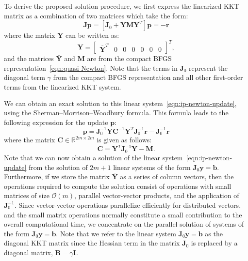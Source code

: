 \documentclass[12pt]{article}
\newcommand{\mb}{\mathbf}
\begin{document}
To derive the proposed solution procedure, we first express the linearized KKT matrix as a combination of two matrices
which take the form:
%
\begin{equation}
  \label{eqn:ip-newton-update}
  \mb{J} \mb{p} = \left[ \mb{J}_{0} + \mb{Y} \mb{M} \mb{Y}^{T} \right] \mb{p} = - \mb{r}
\end{equation}
where the matrix $\mb{Y}$ can be written as:
%
\begin{equation*}
  \mb{Y} = \begin{bmatrix} \bar{\mb{Y}}^T & 0 & 0 & 
    0 & 0 & 0 & 0 \end{bmatrix}^{T}, 
\end{equation*}
and the matrices $\bar{\mb{Y}}$ and $\mb{M}$ are from the compact BFGS
representation~\eqref{eqn:quasi-Newton}. Note that the terms in
$\mb{J}_{0}$ represent the diagonal term $\gamma$ from the compact
BFGS representation and all other first-order terms from the
linearized KKT system.

We can obtain an exact solution to this linear
system~\eqref{eqn:ip-newton-update}, using the
Sherman--Morrison--Woodbury formula.  This formula leads to the
following expression for the update $\mb{p}$:
\begin{equation*}
  \mb{p} = \mb{J}^{-1}_{0} \mb{Y} \mb{C}^{-1} \mb{Y}^{T} \mb{J}_{0}^{-1} \mb{r} - \mb{J}_{0}^{-1} \mb{r}  
\end{equation*}
where the matrix $\mb{C} \in \mathbb{R}^{2m \times 2m}$ is given as
follows:
\begin{equation*}
  \mb{C} = \mb{Y}^{T} \mb{J}_{0}^{-1}\mb{Y} - \mb{M}.
\end{equation*}
Note that we can now obtain a solution of the linear
system~\eqref{eqn:ip-newton-update} from the solution of $2m+1$ linear
systems of the form $\mb{J}_{0}\mb{y} = \mb{b}$.  Furthermore, if we
store the matrix $\bar{\mb{Y}}$ as a series of column vectors, then
the operations required to compute the solution consist of operations
with small matrices of size $\mathcal{O}(m)$, parallel vector-vector
products, and the application of $\mb{J}_{0}^{-1}$. Since
vector-vector operations parallelize efficiently for distributed
vectors, and the small matrix operations normally constitute a small
contribution to the overall computational time, we concentrate on the
parallel solution of systems of the form $\mb{J}_{0} \mb{y} =
\mb{b}$. Note that we refer to the linear system $\mb{J}_{0} \mb{y} =
\mb{b}$ as the diagonal KKT matrix since the Hessian term in the matrix
$\mb{J}_{0}$ is replaced by a diagonal matrix, $\mb{B} =
\gamma\mb{I}$.
\end{document}
